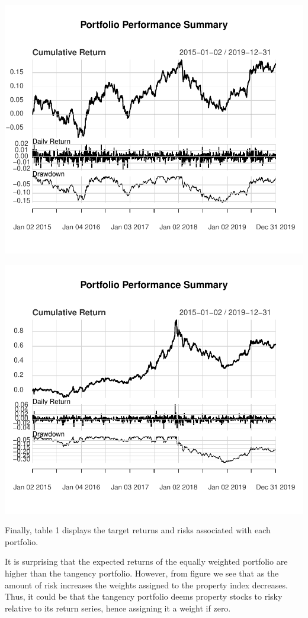\documentclass[11pt,preprint, authoryear]{elsarticle}
\numberwithin{equation}{section}
\numberwithin{figure}{section}
\numberwithin{table}{section}
\begin{document}
\includegraphics{FinMetrics-Essay_files/figure-latex/unnamed-chunk-17-1.pdf}

\includegraphics{FinMetrics-Essay_files/figure-latex/unnamed-chunk-19-1.pdf}

Finally, table 1 displays the target returns and risks associated with
each portfolio.

It is surprising that the expected returns of the equally weighted
portfolio are higher than the tangency portfolio. However, from figure
we see that as the amount of risk increases the weights assigned to the
property index decreases. Thus, it could be that the tangency portfolio
deems property stocks to risky relative to its return series, hence
assigning it a weight if zero.
\end{document}
